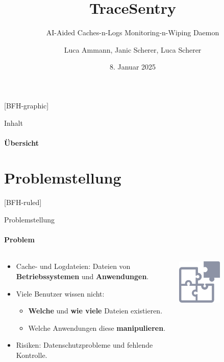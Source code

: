 \documentclass[
    ngerman,%
    authorontitle=true,
]{bfhbeamer}
\title{TraceSentry}
\subtitle{AI-Aided Caches-n-Logs Monitoring-n-Wiping Daemon}
\author[L. Ammann, J. Scherer, L. Scherer]{Luca Ammann, Janic Scherer, Luca Scherer}
\date{8. Januar 2025}
\institute{BFH-TI}
\begin{document}
    [BFH-graphic]
    \maketitle

    \begin{frame}{Inhalt}
        \framesubtitle{Übersicht}
        \tableofcontents
    \end{frame}


    \section{Problemstellung}\label{sec:problemstellung}
    [BFH-ruled]
    \frame{\sectionpage}

    \begin{frame}{Problemstellung}
        \framesubtitle{Problem}
        \begin{columns}
            \begin{column}{0.7\textwidth}
                \begin{itemize}
                    \item Cache- und Logdateien: Dateien von \textbf{Betriebssystemen} und \textbf{Anwendungen}.
                    \item Viele Benutzer wissen nicht:
                    \begin{itemize}
                        \item \textbf{Welche} und \textbf{wie viele} Dateien existieren.
                        \item Welche Anwendungen diese \textbf{manipulieren}.
                    \end{itemize}
                    \item Risiken: Datenschutzprobleme und fehlende Kontrolle.
                \end{itemize}
            \end{column}
            \begin{column}{0.3\textwidth}
                \begin{center}
                    \includegraphics[width=0.5\textwidth]{assets/presentation/puzzle}
                \end{center}
            \end{column}
        \end{columns}
    \end{frame}
\end{document}
